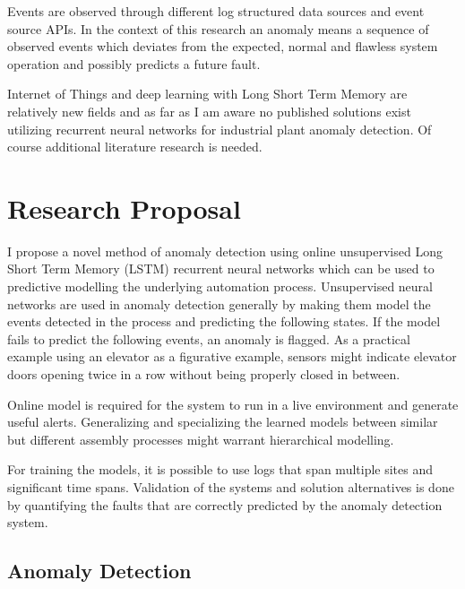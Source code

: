 \documentclass[a4paper,10pt]{article}
\begin{document}
Events are observed through different log structured data sources and event source APIs. In the context of this research an anomaly means a sequence of observed events which
deviates from the expected, normal and flawless system operation and possibly predicts a future fault.

Internet of Things and deep learning with Long Short Term Memory are relatively new fields and as far as I am aware no published solutions exist utilizing
recurrent neural networks for industrial plant anomaly detection. Of course additional literature research is needed.

\section{Research Proposal}

I propose a novel method of anomaly detection using online unsupervised Long Short Term Memory (LSTM)\cite{LSTM} recurrent neural networks which can be used to predictive
modelling the underlying automation process. Unsupervised neural networks are used in anomaly detection generally by making them model the events detected
in the process and predicting the following states. If the model fails to predict the following events, an anomaly is flagged.
As a practical example using an elevator as a figurative example, sensors might indicate elevator doors opening twice in a row without being properly closed in between.

Online model is required for the system to run in a live environment and generate useful alerts. Generalizing and specializing the learned models between similar but
different assembly processes might warrant hierarchical modelling.

For training the models, it is possible to use logs that span multiple sites and significant time spans. Validation of the systems and solution alternatives is done by quantifying
the faults that are correctly predicted by the anomaly detection system. 

\subsection{Anomaly Detection}
\end{document}
